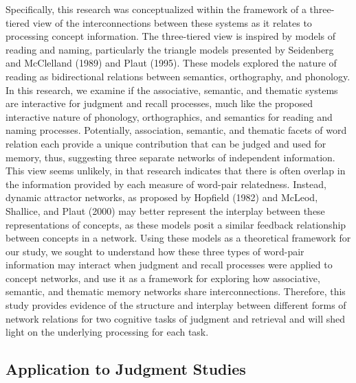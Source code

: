 \documentclass[english,man]{apa6}
\theoremstyle{definition}
\theoremstyle{definition}
\theoremstyle{definition}
\theoremstyle{remark}
\begin{document}
Specifically, this research was conceptualized within the framework of a
three-tiered view of the interconnections between these systems as it
relates to processing concept information. The three-tiered view is
inspired by models of reading and naming, particularly the triangle
models presented by Seidenberg and McClelland (1989) and Plaut (1995).
These models explored the nature of reading as bidirectional relations
between semantics, orthography, and phonology. In this research, we
examine if the associative, semantic, and thematic systems are
interactive for judgment and recall processes, much like the proposed
interactive nature of phonology, orthographics, and semantics for
reading and naming processes. Potentially, association, semantic, and
thematic facets of word relation each provide a unique contribution that
can be judged and used for memory, thus, suggesting three separate
networks of independent information. This view seems unlikely, in that
research indicates that there is often overlap in the information
provided by each measure of word-pair relatedness. Instead, dynamic
attractor networks, as proposed by Hopfield (1982) and McLeod, Shallice,
and Plaut (2000) may better represent the interplay between these
representations of concepts, as these models posit a similar feedback
relationship between concepts in a network. Using these models as a
theoretical framework for our study, we sought to understand how these
three types of word-pair information may interact when judgment and
recall processes were applied to concept networks, and use it as a
framework for exploring how associative, semantic, and thematic memory
networks share interconnections. Therefore, this study provides evidence
of the structure and interplay between different forms of network
relations for two cognitive tasks of judgment and retrieval and will
shed light on the underlying processing for each task.

\subsection{Application to Judgment
Studies}\label{application-to-judgment-studies}
\end{document}
